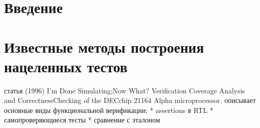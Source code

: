 \documentclass[14pt]{extreport}
\begin{document}
\pagebreak

\tableofcontents










\chapter*{Введение}







\chapter{Известные методы построения нацеленных тестов}


статья (1996)
I’m Done Simulating;Now What? Verification Coverage Analysis and CorrectnessChecking of the DECchip 21164 Alpha microprocessor.
описывает основные виды функциональной верификации:
* assertions в RTL
* самопроверяющиеся тесты
* сравнение с эталоном
\end{document}
